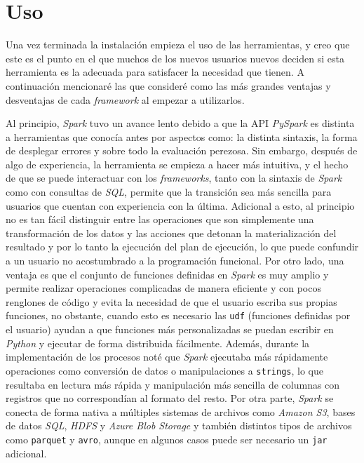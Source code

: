 \section{Uso}

Una vez terminada la instalación empieza el uso de las herramientas, y creo que este es el punto en el que muchos de los nuevos usuarios nuevos deciden si esta herramienta es la adecuada para satisfacer la necesidad que tienen. A continuación mencionaré las que consideré como las más grandes ventajas y desventajas de cada \textit{framework} al empezar a utilizarlos.

Al principio, \textit{Spark} tuvo un avance lento debido a que la API \textit{PySpark} es distinta a herramientas que conocía antes por aspectos como: la distinta sintaxis, la forma de desplegar errores y sobre todo la evaluación perezosa. Sin embargo, después de algo de experiencia, la herramienta se empieza a hacer más intuitiva, y el hecho de que se puede interactuar con los \textit{frameworks}, tanto con la sintaxis de \textit{Spark} como con consultas de \textit{SQL}, permite que la transición sea más sencilla para usuarios que cuentan con experiencia con la última. Adicional a esto, al principio no es tan fácil distinguir entre las operaciones que son simplemente una transformación de los datos y las acciones que detonan la materialización del resultado y por lo tanto la ejecución del plan de ejecución, lo que puede confundir a un usuario no acostumbrado a la programación funcional. Por otro lado, una ventaja es que el conjunto de funciones definidas en \textit{Spark} es muy amplio y permite realizar operaciones complicadas de manera eficiente y con pocos renglones de código y evita la necesidad de que el usuario escriba sus propias funciones, no obstante, cuando esto es necesario las \texttt{udf} (funciones definidas por el usuario) ayudan a que funciones más personalizadas se puedan escribir en \textit{Python} y ejecutar de forma distribuida fácilmente. Además, durante la implementación de los procesos noté que \textit{Spark} ejecutaba más rápidamente operaciones como conversión de datos o manipulaciones a \texttt{strings}, lo que resultaba en lectura más rápida y manipulación más sencilla de columnas con registros que no correspondían al formato del resto. Por otra parte, \textit{Spark} se conecta de forma nativa a múltiples sistemas de archivos como \textit{Amazon S3}, bases de datos \textit{SQL}, \textit{HDFS} y \textit{Azure Blob Storage} y también distintos tipos de archivos como \texttt{parquet} y \texttt{avro}, aunque en algunos casos puede ser necesario un \texttt{jar} adicional.

